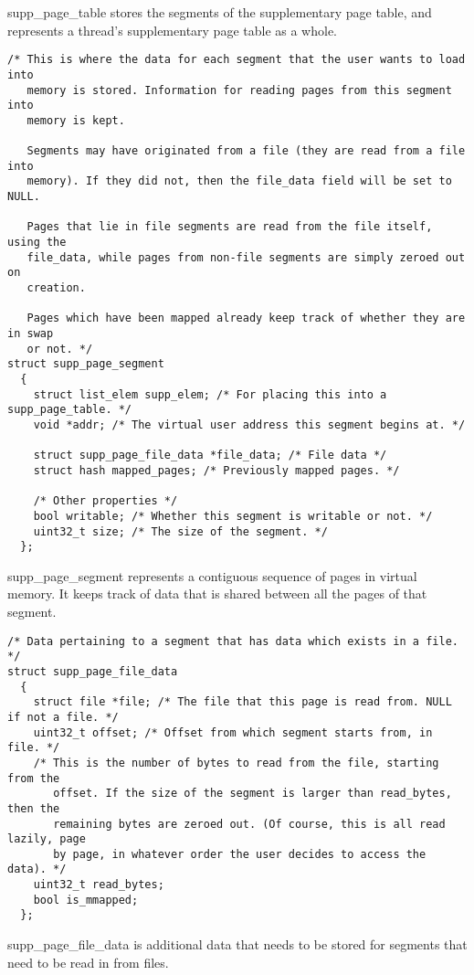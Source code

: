 supp\_page\_table stores the segments of the supplementary page table, and
represents a thread's supplementary page table as a whole.

\begin{verbatim}
/* This is where the data for each segment that the user wants to load into
   memory is stored. Information for reading pages from this segment into
   memory is kept.

   Segments may have originated from a file (they are read from a file into
   memory). If they did not, then the file_data field will be set to NULL.

   Pages that lie in file segments are read from the file itself, using the
   file_data, while pages from non-file segments are simply zeroed out on
   creation.

   Pages which have been mapped already keep track of whether they are in swap
   or not. */
struct supp_page_segment
  {
    struct list_elem supp_elem; /* For placing this into a supp_page_table. */
    void *addr; /* The virtual user address this segment begins at. */

    struct supp_page_file_data *file_data; /* File data */
    struct hash mapped_pages; /* Previously mapped pages. */

    /* Other properties */
    bool writable; /* Whether this segment is writable or not. */
    uint32_t size; /* The size of the segment. */
  };
\end{verbatim}

supp\_page\_segment represents a contiguous sequence of pages in virtual memory.
It keeps track of data that is shared between all the pages of that segment.

\begin{verbatim}
/* Data pertaining to a segment that has data which exists in a file. */
struct supp_page_file_data
  {
    struct file *file; /* The file that this page is read from. NULL if not a file. */
    uint32_t offset; /* Offset from which segment starts from, in file. */
    /* This is the number of bytes to read from the file, starting from the
       offset. If the size of the segment is larger than read_bytes, then the
       remaining bytes are zeroed out. (Of course, this is all read lazily, page
       by page, in whatever order the user decides to access the data). */
    uint32_t read_bytes;
    bool is_mmapped;
  };
\end{verbatim}

supp\_page\_file\_data is additional data that needs to be stored for segments
that need to be read in from files.

